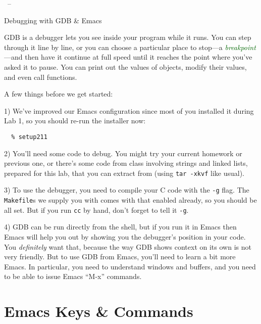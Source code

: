 \documentclass[11pt]{article}
\newcommand\keyterm[1]{\textcolor[HTML]{006600}{\emph{#1}}}
\begin{document}
%

\begin{center}
  \sffamily
  \COURSENO\ – \TERM\par
  \Huge
  Debugging
  \Large
  with GDB \& Emacs
\end{center}

\begin{multicols}{2}

GDB is a debugger lets you see inside your program while it runs. You
  can step through it line by line, or you can choose a particular place
  to stop—a \keyterm{breakpoint}—and then have it continue at full speed
  until it reaches the point where you’ve asked it to pause. You can
  print out the values of objects, modify their values, and even call
  functions.

  A few things before we get started:


      1) We’ve improved our Emacs configuration since most of you
      installed it during Lab 1, so you should re-run the installer now:

      \verb!  % setup211!

      2) You’ll need some code to debug. You might try your current
      homework or previous one, or there’s some code from class
      involving strings and linked lists, prepared for this lab, that
      you can extract from \textsf{\ThisLabTgz} (using \verb!tar -xkvf!
      like usual).

      3) To use the debugger, you need to compile your C code with the
      \verb!-g! flag. The \verb!Makefile!s we supply you with comes
      with that enabled already, so you should be all set. But if you
      run \verb!cc! by hand, don't forget to tell it \verb!-g!.

      4) GDB can be run directly from the shell, but if you run it
      in Emacs then Emacs will help you out by showing you the
      debugger’s position in your code. You \emph{definitely} want that,
      because the way GDB shows context on its own
      is not very friendly. But to use GDB from Emacs, you’ll need to
      learn a bit more Emacs. In particular, you need to understand
      windows and buffers, and you need to be able to issue Emacs
      “\textsf{M-x}” commands.


\section*{Emacs Keys \& Commands}


\end{multicols}
\end{document}
